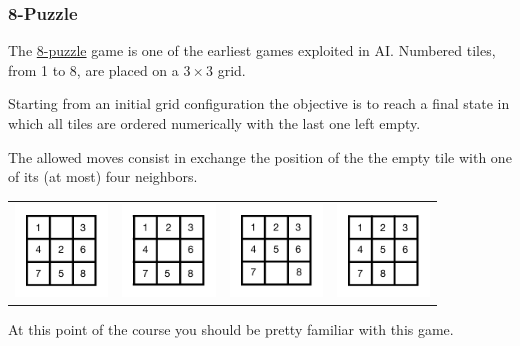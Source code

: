 \documentclass[xcolor={usenames,dvipsnames,svgnames}, compress]{beamer}
\begin{document}
\begin{frame}
  \frametitle{8-Puzzle}
  The \href{http://en.wikipedia.org/wiki/15_puzzle}{8-puzzle} game is
  one of the earliest games exploited in AI. Numbered tiles, from 1 to
  8, are placed on a $3\times3$ grid.\par Starting from an initial grid
  configuration the objective is to reach a final state in which all
  tiles are ordered numerically with the last one left empty.\par
  The allowed moves consist in exchange the position of the the empty
  tile with one of its (at most) four neighbors.
  \begin{table}
    \setlength\tabcolsep{2pt}
    \centering
    \tiny
    \begin{tabular}{c c c c }
      \includegraphics[width=70pt]{Figures/8-puzzle-4}
      & \includegraphics[width=70pt]{Figures/8-puzzle-3}
      & \includegraphics[width=70pt]{Figures/8-puzzle-2}
      & \includegraphics[width=70pt]{Figures/8-puzzle-1}\\
    \end{tabular}
  \end{table}
  At this point of the course you should be pretty familiar with this game.
\end{frame}
\end{document}
